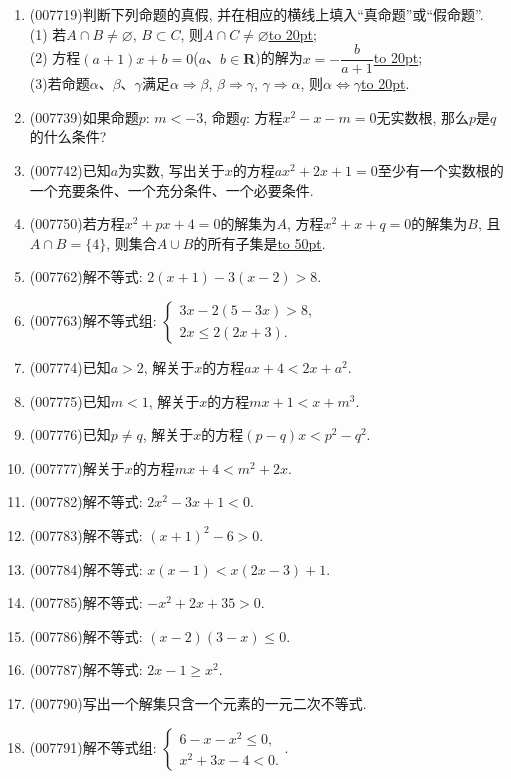 \documentclass[10pt,a4paper]{article}
\newcommand{\blank}[1]{\underline{\hbox to #1pt{}}}
\begin{document}
\begin{enumerate}[1.]
\item {\tiny (007719)}判断下列命题的真假, 并在相应的横线上填入``真命题''或``假命题''.\\
(1) 若$A\cap B\ne \varnothing$, $B\subset C$, 则$A\cap C\ne \varnothing$\blank{20};\\
(2) 方程$(a+1)x+b=0$($a$、$b\in \mathbf{R}$)的解为$x=-\dfrac b{a+1}$\blank{20};\\
(3)若命题$\alpha$、$\beta$、$\gamma$满足$\alpha \Rightarrow \beta$, $\beta \Rightarrow \gamma$, $\gamma \Rightarrow \alpha$, 则$\alpha \Leftrightarrow \gamma$\blank{20}.
\item {\tiny (007739)}如果命题$p$: $m<-3$, 命题$q$: 方程$x^2-x-m=0$无实数根, 那么$p$是$q$的什么条件?
\item {\tiny (007742)}已知$a$为实数, 写出关于$x$的方程$ax^2+2x+1=0$至少有一个实数根的一个充要条件、一个充分条件、一个必要条件.
\item {\tiny (007750)}若方程$x^2+px+4=0$的解集为$A$, 方程$x^2+x+q=0$的解集为$B$, 且$A\cap B=\{4\}$, 则集合$A\cup B$的所有子集是\blank{50}.
\item {\tiny (007762)}解不等式: $2(x+1)-3(x-2)>8$.
\item {\tiny (007763)}解不等式组: $\begin{cases} 3x-2(5-3x)>8, \\ 2x\le 2(2x+3). \end{cases}$
\item {\tiny (007774)}已知$a>2$, 解关于$x$的方程$ax+4<2x+a^2$.
\item {\tiny (007775)}已知$m<1$, 解关于$x$的方程$mx+1<x+m^3$.
\item {\tiny (007776)}已知$p\ne q$, 解关于$x$的方程$(p-q)x<p^2-q^2$.
\item {\tiny (007777)}解关于$x$的方程$mx+4<m^2+2x$.
\item {\tiny (007782)}解不等式: $2x^2-3x+1<0$.
\item {\tiny (007783)}解不等式: $(x+1)^2-6>0$.
\item {\tiny (007784)}解不等式: $x(x-1)<x(2x-3)+1$.
\item {\tiny (007785)}解不等式: $-x^2+2x+35>0$.
\item {\tiny (007786)}解不等式: $(x-2)(3-x)\le 0$.
\item {\tiny (007787)}解不等式: $2x-1\ge x^2$.
\item {\tiny (007790)}写出一个解集只含一个元素的一元二次不等式.
\item {\tiny (007791)}解不等式组: $\begin{cases} 6-x-x^2\le 0, \\ x^2+3x-4<0. \end{cases}$.

\end{enumerate}
\end{document}
